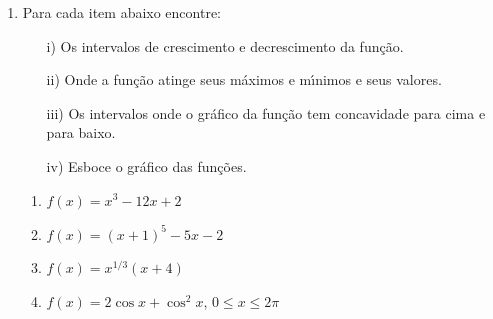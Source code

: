 \documentclass[a4paper,5pt]{amsbook}
\begin{document}
\begin{enumerate}
    \vspace{0.5cm}
    \item Para cada item abaixo encontre:
        \begin{enumerate}
            \item[i)] Os intervalos de crescimento e decrescimento da fun\c{c}\~ao.
            \item[ii)] Onde a fun\c{c}\~ao atinge seus m\'aximos e m\'{\i}nimos e seus valores.
            \item[iii)] Os intervalos onde o gr\'afico da fun\c{c}\~ao tem concavidade para cima e para baixo.
            \item[iv)] Esboce o gr\'afico das fun\c{c}\~oes.
        \end{enumerate}
        \vspace{0.3cm}
        \begin{enumerate}
            \item $f(x)=x^3-12x+2$
            \item $f(x)={(x+1)}^5-5x-2$
            \item $f(x)=x^{1/3}(x+4)$
            \item $f(x)=2\cos{x}+\cos^2{x}$, $0\le x \le 2\pi$
        \end{enumerate}

\end{enumerate}
\end{document}
